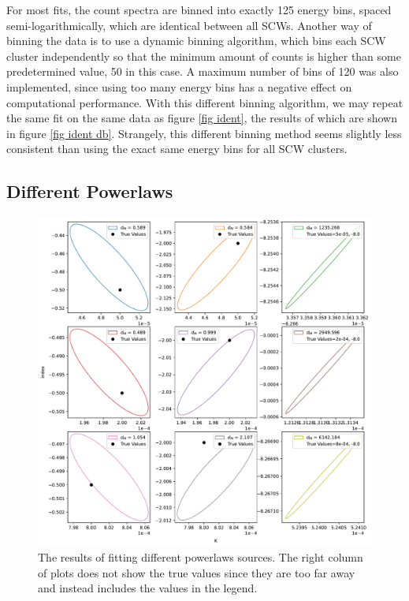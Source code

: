 \documentclass{article}
\begin{document}
For most fits, the count spectra are binned into exactly 125 energy bins, spaced semi-logarithmically, which are identical between all SCWs. Another way of binning the data is to use a dynamic binning algorithm, which bins each SCW cluster independently so that the minimum amount of counts is higher than some predetermined value, 50 in this case. A maximum number of bins of 120 was also implemented, since using too many energy bins has a negative effect on computational performance. With this different binning algorithm, we may repeat the same fit on the same data as figure \ref{fig ident}, the results of which are shown in figure \ref{fig ident db}. Strangely, this different binning method seems slightly less consistent than using the exact same energy bins for all SCW clusters. 

\FloatBarrier

\subsection{Different Powerlaws}

\begin{figure}[h]
    \centering
    \includegraphics[width=\textwidth]{Images/index_k.pdf}
    \caption{The results of fitting different powerlaws sources. The right column of plots does not show the true values since they are too far away and instead includes the values in the legend.}
    \label{fig index k}
\end{figure}
\end{document}
